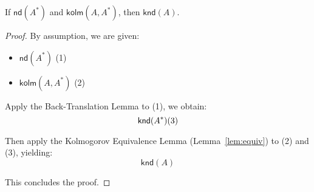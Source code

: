 \documentclass{article}
\begin{document}
\label{lem:completeness}
If $\textsf{nd}(A^*)$ and $\textsf{kolm}(A, A^*)$, then $\textsf{knd}(A)$.


\begin{proof}
By assumption, we are given:
\begin{itemize}
    \item $\textsf{nd}(A^*)$ \hfill (1)
    \item $\textsf{kolm}(A, A^*)$ \hfill (2)
\end{itemize}

Apply the Back-Translation Lemma to (1), we obtain:
\[
\textsf{knd}(A^*) \hfill (3)
\]

Then apply the Kolmogorov Equivalence Lemma (Lemma~\ref{lem:equiv}) to (2) and (3), yielding:
\[
\textsf{knd}(A)
\]

This concludes the proof.
\end{proof}
\end{document}
